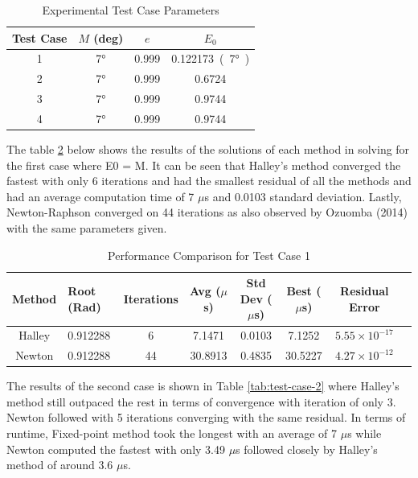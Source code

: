 \documentclass[a4paper,11pt]{article}
\begin{document}
\begin{table}[H]
    \centering
    \caption{Experimental Test Case Parameters}
    \label{tab:test-summary}
    \vspace{2mm}
    \begin{tabular}{cccc}
        \toprule
        Test Case & $M$ (deg) & $e$ & $E_0$ \\
        \midrule
        1 & \ang{7} & 0.999 & \SI{0.122173} (\ang{7}) \\
        2 & \ang{7} & 0.999 & 0.6724 \\
        3 & \ang{7} & 0.999 & 0.9744 \\
        4 & \ang{7} & 0.999 & 0.9744 \\
        \bottomrule
    \end{tabular}
\end{table}

The table \ref{tab:test-case-1}  below shows the results of the solutions of each method in solving for the first case where E0 = M. It can be seen that Halley's method converged the fastest with only 6 iterations and had the smallest residual of all the methods and had an average computation time of 7 $\mu$s and 0.0103 standard deviation. Lastly, Newton-Raphson converged on 44 iterations as also observed by Ozuomba (2014) with the same parameters given.

\begin{table}[H]
    \centering
    \caption{Performance Comparison for Test Case 1}
    \label{tab:test-case-1}
    \vspace{2mm}
    \begin{tabularx}{\textwidth}{clcccccc}
        \toprule
        Method & Root (Rad) & Iterations & Avg ($\mu$s) & Std Dev ($\mu$s) & Best ($\mu$s) & Residual Error \\
        \midrule
         Halley & 0.912288 & 6 & 7.1471 & 0.0103 & 7.1252 & $5.55 \times 10^{-17}$ \\
         Newton & 0.912288 & 44 & 30.8913 & 0.4835 & 30.5227 & $4.27 \times 10^{-12}$ \\
        \bottomrule
    \end{tabularx}
\end{table}

The results of the second case is shown in Table \ref{tab:test-case-2} where Halley's method still outpaced the rest in terms of convergence with iteration of only 3. Newton followed with 5 iterations converging with the same residual. In terms of runtime, Fixed-point method took the longest with an average of 7 $\mu$s while Newton computed the fastest with only 3.49 $\mu$s followed closely by Halley's method of around 3.6 $\mu$s.
\end{document}
